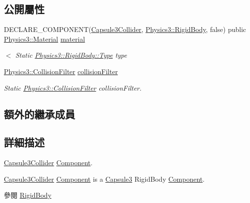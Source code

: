 \subsection*{公開屬性}
\begin{DoxyCompactItemize}
\item 
D\+E\+C\+L\+A\+R\+E\+\_\+\+C\+O\+M\+P\+O\+N\+E\+NT(\hyperlink{class_magnum_1_1_capsule3_collider}{Capsule3\+Collider}, \hyperlink{class_magnum_1_1_physics3_1_1_rigid_body}{Physics3\+::\+Rigid\+Body}, false) public \hyperlink{class_magnum_1_1_physics3_1_1_material}{Physics3\+::\+Material} \hyperlink{class_magnum_1_1_capsule3_collider_ad3730085eea82d77cf999f41439c4c10}{material}
\begin{DoxyCompactList}\small\item\em $<$ Static \hyperlink{class_magnum_1_1_physics3_1_1_rigid_body_a429aa4fb7256b083334c86cdcd0d6b31}{Physics3\+::\+Rigid\+Body\+::\+Type} type \end{DoxyCompactList}\item 
\hyperlink{class_magnum_1_1_physics3_1_1_collision_filter}{Physics3\+::\+Collision\+Filter} \hyperlink{class_magnum_1_1_capsule3_collider_a39f4f1d7bd9eb3eeab98ccfb49ea9369}{collision\+Filter}\hypertarget{class_magnum_1_1_capsule3_collider_a39f4f1d7bd9eb3eeab98ccfb49ea9369}{}\label{class_magnum_1_1_capsule3_collider_a39f4f1d7bd9eb3eeab98ccfb49ea9369}

\begin{DoxyCompactList}\small\item\em Static \hyperlink{class_magnum_1_1_physics3_1_1_collision_filter}{Physics3\+::\+Collision\+Filter} collision\+Filter. \end{DoxyCompactList}\end{DoxyCompactItemize}
\subsection*{額外的繼承成員}


\subsection{詳細描述}
\hyperlink{class_magnum_1_1_capsule3_collider}{Capsule3\+Collider} \hyperlink{class_magnum_1_1_component}{Component}. 

\hyperlink{class_magnum_1_1_capsule3_collider}{Capsule3\+Collider} \hyperlink{class_magnum_1_1_component}{Component} is a \hyperlink{class_magnum_1_1_capsule3}{Capsule3} Rigid\+Body \hyperlink{class_magnum_1_1_component}{Component}. \begin{DoxySeeAlso}{參閱}
\hyperlink{class_magnum_1_1_physics3_1_1_rigid_body_a2327744d90c049296ea0d63b3e64d335}{Rigid\+Body} 
\end{DoxySeeAlso}


